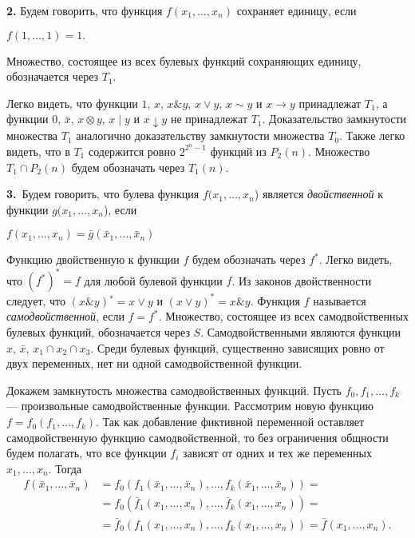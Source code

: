 \documentclass[10pt]{article}
\begin{document}
{\bf{2.}} Будем говорить, что функция $f(x_1, \dots,x_n)$ сохраняет единицу, если
\begin{center} $f(1, \dots, 1) = 1.$\end{center}
Множество, состоящее из всех булевых функций сохраняющих единицу,
обозначается через $T_1$.
\newpage \par
Легко видеть, что функции $1$, $x$, $x\&y$, $x \vee y$, $x \sim y$ и $x \to y$ принадлежат
$T_1$, а функции $0$, $\bar x$, $x \otimes y$, $x \mid y$ и $x \downarrow y$ не принадлежат $T_1$. Доказательство
замкнутости множества $T_1$ аналогично доказательству замкнутости множества
$T_0$. Также легко видеть, что в $T_1$ содержится ровно $2^{2^n−1}$ функций из
$P_{2}(n)$. Множество $T_1 \cap P_{2}(n)$ будем обозначать через $T_{1}(n)$. \par
{\bf{3.}}\, Будем говорить, что булева функция $f(x_1,\dots,x_n$) является \textit{двойственной} к функции $g(x_1, \dots, x_n$), если
\begin{center} $f(x_1, \dots, x_n) = \bar{g}(\bar{x}_1, \dots, \bar{x}_n)$\end{center}
Функцию двойственную к функции $f$ будем обозначать через $f^{*}$. Легко видеть,
 что $(f^{*})^{*} = f$ для любой булевой функции $f$. Из законов двойственности
 следует, что $(x\&y)^{∗} = x \vee y$ и $(x \vee y)^{*} = x\&y.$ Функция $f$ называется
\textit{самодвойственной}, если $f = f^{*}$. Множество, состоящее из всех самодвойственных
 булевых функций, обозначается через $S$. Самодвойственными являются
 функции $x$, $\bar{x}$, $x_1 \cap x_2 \cap x_3.$ Среди булевых функций, существенно
  зависящих ровно от двух переменных, нет ни одной самодвойственной
функции. \par
Докажем замкнутость множества самодвойственных функций. Пусть
$f_0, f_1, \dots, f_k$ — произвольные самодвойственные функции. Рассмотрим новую
функцию $f = f_0(f_1, \dots, f_k)$. Так как добавление фиктивной переменной
оставляет самодвойственную функцию самодвойственной, то без ограничения
общности будем полагать, что все функции $f_i$ зависят от одних и тех
же переменных $x_1,\dots, x_n$. Тогда\\
\begin{align*}
f(\bar{x}_1, \dots, \bar{x}_n) &= f_0(f_1(\bar{x}_1, \dots, \bar{x}_n), \dots, f_k(\bar{x}_1, \dots, \bar{x}_n))= \\
                               &= f_0(\bar{f}_1(x_1, \dots, x_n), \dots, \bar{f}_k(x_1, \dots, x_n))= \\
                               &= \bar{f}_0(f_1(x_1, \dots, x_n), \dots, f_k(x_1, \dots, x_n)) = \bar{f}(x_1, \dots, x_n).
\end{align*}
\end{document}
